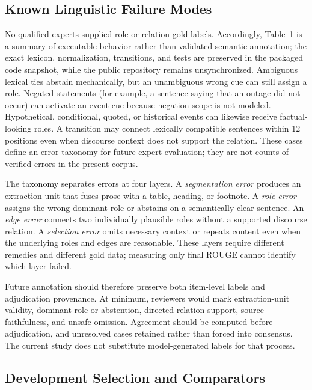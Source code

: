 \documentclass[applsci,article,submit,moreauthors]{Definitions/mdpi}
\begin{document}
\subsection{Known Linguistic Failure Modes}

No qualified experts supplied role or relation gold labels. Accordingly, Table~1 is a summary of executable behavior rather than validated semantic annotation; the exact lexicon, normalization, transitions, and tests are preserved in the packaged code snapshot, while the public repository remains unsynchronized. Ambiguous lexical ties abstain mechanically, but an unambiguous wrong cue can still assign a role. Negated statements (for example, a sentence saying that an outage did not occur) can activate an event cue because negation scope is not modeled. Hypothetical, conditional, quoted, or historical events can likewise receive factual-looking roles. A transition may connect lexically compatible sentences within 12 positions even when discourse context does not support the relation. These cases define an error taxonomy for future expert evaluation; they are not counts of verified errors in the present corpus.

The taxonomy separates errors at four layers. A \textit{segmentation error} produces an extraction unit that fuses prose with a table, heading, or footnote. A \textit{role error} assigns the wrong dominant role or abstains on a semantically clear sentence. An \textit{edge error} connects two individually plausible roles without a supported discourse relation. A \textit{selection error} omits necessary context or repeats content even when the underlying roles and edges are reasonable. These layers require different remedies and different gold data; measuring only final ROUGE cannot identify which layer failed.

Future annotation should therefore preserve both item-level labels and adjudication provenance. At minimum, reviewers would mark extraction-unit validity, dominant role or abstention, directed relation support, source faithfulness, and unsafe omission. Agreement should be computed before adjudication, and unresolved cases retained rather than forced into consensus. The current study does not substitute model-generated labels for that process.

\subsection{Development Selection and Comparators}
\end{document}

